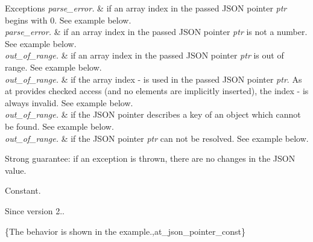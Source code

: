 \begin{DoxyExceptions}{Exceptions}
{\em parse\+\_\+error.} & if an array index in the passed J\+S\+ON pointer {\itshape ptr} begins with \textquotesingle{}0\textquotesingle{}. See example below.\\
\hline
{\em parse\+\_\+error.} & if an array index in the passed J\+S\+ON pointer {\itshape ptr} is not a number. See example below.\\
\hline
{\em out\+\_\+of\+\_\+range.} & if an array index in the passed J\+S\+ON pointer {\itshape ptr} is out of range. See example below.\\
\hline
{\em out\+\_\+of\+\_\+range.} & if the array index \textquotesingle{}-\/\textquotesingle{} is used in the passed J\+S\+ON pointer {\itshape ptr}. As {\ttfamily at} provides checked access (and no elements are implicitly inserted), the index \textquotesingle{}-\/\textquotesingle{} is always invalid. See example below.\\
\hline
{\em out\+\_\+of\+\_\+range.} & if the J\+S\+ON pointer describes a key of an object which cannot be found. See example below.\\
\hline
{\em out\+\_\+of\+\_\+range.} & if the J\+S\+ON pointer {\itshape ptr} can not be resolved. See example below.\\
\hline
\end{DoxyExceptions}
Strong guarantee\+: if an exception is thrown, there are no changes in the J\+S\+ON value.

Constant.

\begin{DoxySince}{Since}
version 2..
\end{DoxySince}
\{The behavior is shown in the example.,at\+\_\+json\+\_\+pointer\+\_\+const\} \mbox{\label{classnlohmann_1_1basic__json_a011397134847f36db0ed7d7a93753677}} 
